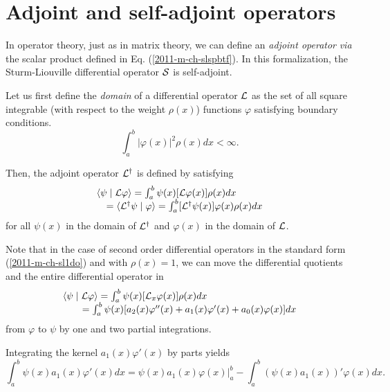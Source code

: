 \section{Adjoint and self-adjoint operators}

In operator theory,
just as in matrix theory,
we can define an
{\em adjoint operator}
{\it via} the scalar product
defined in Eq. (\ref{2011-m-ch-slspbtf}).
In this formalization,
the Sturm-Liouville differential operator ${\cal S}$
is self-adjoint.

Let us first define the
{\em domain}  of a differential operator ${\cal L}$ as the set of all  square integrable
(with respect to the weight  $\rho  (x)$)
functions $\varphi$ satisfying boundary conditions.
\begin{equation}
\int_a^b \vert \varphi (x) \vert^2 \rho  (x) dx < \infty
.
\end{equation}


Then, the adjoint operator  ${\cal L}^\dagger$ is defined by  satisfying
\begin{equation}
\begin{array}  {l}
\langle \psi \mid {\cal L} \varphi \rangle
=
\int_a^b
\psi (x) [{\cal L}\varphi (x)]
\rho  (x)         dx
\\
\quad =\langle {\cal L}^\dagger \psi \mid \varphi \rangle
=
\int_a^b
[{\cal L}^\dagger \psi (x)] \varphi (x)
\rho  (x)         dx
\end{array}
\label{2011-m-ch-slspbtfao}
\end{equation}
for all $\psi (x)$ in the domain of ${\cal L}^\dagger$ and $\varphi (x)$ in the domain of ${\cal L}$.

Note that  in the case of second order differential operators
in the standard form (\ref{2011-m-ch-sl1do})  and with $\rho  (x) = 1$,
we can move the differential quotients and the entire differential operator in
\begin{equation}
\begin{array}  {l}
\langle \psi \mid {\cal L} \varphi \rangle
=
\int_a^b
\psi (x) [{\cal L}_x\varphi (x)]
\rho  (x)         dx   \\
\qquad =
\int_a^b
\psi (x)
[a_2(x) \varphi''(x) + a_1(x) \varphi'(x) + a_0(x) \varphi (x)]
dx
\end{array}
\label{2011-m-ch-slspbtfao1a}
\end{equation}
from
$\varphi$ to $\psi$
by one and two partial integrations.

Integrating the  kernel $a_1(x) \varphi'(x)$ by parts yields
\begin{equation}
\int_a^b
\psi (x)
  a_1(x) \varphi'(x)
dx
=
\left.
\psi (x)
  a_1(x) \varphi(x)
\right|_a^b -  \int_a^b
(\psi (x)
  a_1(x) )'\varphi(x)
dx
.
\end{equation}

